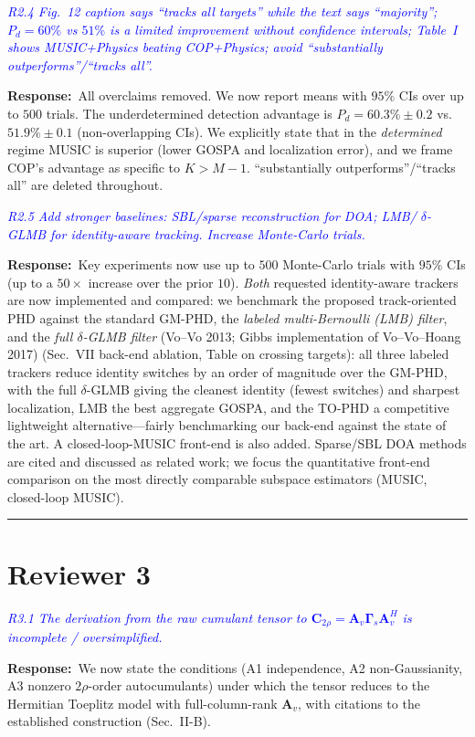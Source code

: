 \documentclass[11pt]{article}
\newcommand{\rc}[1]{\textit{\textcolor{blue}{#1}}}      %
\newcommand{\reply}{\par\noindent\textbf{Response:}\ }
\begin{document}
\rc{R2.4 Fig.~12 caption says ``tracks all targets'' while the text says
``majority''; $P_d=60\%$ vs $51\%$ is a limited improvement without confidence
intervals; Table~I shows MUSIC+Physics beating COP+Physics; avoid ``substantially
outperforms''/``tracks all''.}
\reply All overclaims removed. We now report means with $95\%$ CIs over up to
$500$ trials. The underdetermined detection advantage is $P_d=60.3\%\pm0.2$ vs.
$51.9\%\pm0.1$ (non-overlapping CIs). We explicitly state that in the
\emph{determined} regime MUSIC is superior (lower GOSPA and localization error),
and we frame COP's advantage as specific to $K>M-1$. ``substantially
outperforms''/``tracks all'' are deleted throughout.

\rc{R2.5 Add stronger baselines: SBL/sparse reconstruction for DOA; LMB/
$\delta$-GLMB for identity-aware tracking. Increase Monte-Carlo trials.}
\reply Key experiments now use up to $500$ Monte-Carlo trials with $95\%$ CIs (up
to a $50\times$ increase over the prior $10$). \emph{Both} requested identity-aware
trackers are now implemented and compared: we benchmark the proposed
track-oriented PHD against the standard GM-PHD, the \emph{labeled multi-Bernoulli
(LMB) filter}, and the \emph{full $\delta$-GLMB filter} (Vo--Vo 2013; Gibbs
implementation of Vo--Vo--Hoang 2017) (Sec.~VII back-end ablation, Table on
crossing targets): all three labeled trackers reduce identity switches by an order
of magnitude over the GM-PHD, with the full $\delta$-GLMB giving the cleanest
identity (fewest switches) and sharpest localization, LMB the best aggregate
GOSPA, and the TO-PHD a competitive lightweight alternative---fairly benchmarking
our back-end against the state of the art. A closed-loop-MUSIC front-end is also
added. Sparse/SBL DOA
methods are cited and discussed as related work; we focus the quantitative
front-end comparison on the most directly comparable subspace estimators (MUSIC,
closed-loop MUSIC).

\hrule
\section*{Reviewer 3}

\rc{R3.1 The derivation from the raw cumulant tensor to
$\mathbf C_{2\rho}=\mathbf A_v\mathbf\Gamma_s\mathbf A_v^H$ is incomplete /
oversimplified.}
\reply We now state the conditions (A1 independence, A2 non-Gaussianity, A3
nonzero $2\rho$-order autocumulants) under which the tensor reduces to the
Hermitian Toeplitz model with full-column-rank $\mathbf A_v$, with citations to
the established construction (Sec.~II-B).
\end{document}
